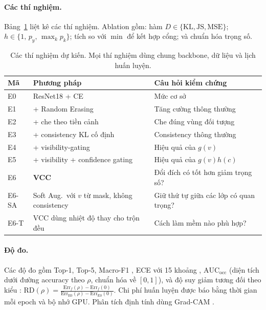 \documentclass[11pt,a4paper]{article}
\theoremstyle{plain}
\theoremstyle{definition}
\theoremstyle{remark}
\newcommand{\KL}{\mathrm{KL}}
\begin{document}
\paragraph{Các thí nghiệm.} Bảng~\ref{tab:exps} liệt kê các thí nghiệm. Ablation gồm: hàm $D\in\{\KL,\mathrm{JS},\mathrm{MSE}\}$; $h\in\{1,\,p_y,\,\max_k p_k\}$; tích so với $\min$ để kết hợp cổng; và chuẩn hóa trọng số.

\begin{table}[t]
\centering
\caption{Các thí nghiệm dự kiến. Mọi thí nghiệm dùng chung backbone, dữ liệu và lịch huấn luyện.}
\label{tab:exps}
\begin{tabular}{@{}lll@{}}
\toprule
Mã & Phương pháp & Câu hỏi kiểm chứng \\
\midrule
E0 & ResNet18 + CE & Mức cơ sở \\
E1 & + Random Erasing \cite{zhong2020random} & Tăng cường thông thường \\
E2 & + che theo tiền cảnh & Che đúng vùng đối tượng \\
E3 & + consistency KL cố định & Consistency thông thường \\
E4 & + visibility-gating & Hiệu quả của $g(v)$ \\
E5 & + visibility + confidence gating & Hiệu quả của $g(v)h(c)$ \\
E6 & \textbf{VCC} & Đổi đích có tốt hơn giảm trọng số? \\
E6-SA & Soft Aug.\ với $v$ từ mask, không consistency & Giữ thứ tự giữa các lớp có quan trọng? \\
E6-T & VCC dùng nhiệt độ thay cho trộn đều & Cách làm mềm nào phù hợp? \\
\bottomrule
\end{tabular}
\end{table}

\paragraph{Độ đo.} Các độ đo gồm Top-1, Top-5, Macro-F1 \cite{sokolova2009systematic}, ECE với 15 khoảng \cite{guo2017calibration}, $\mathrm{AUC}_{\mathrm{occ}}$ (diện tích dưới đường accuracy theo $\rho$, chuẩn hóa về $[0,1]$), và độ suy giảm tương đối theo kiểu \cite{hendrycks2019benchmarking}:
\(
  \mathrm{RD}(\rho)=\frac{\mathrm{Err}_f(\rho)-\mathrm{Err}_f(0)}{\mathrm{Err}_{\mathrm{E0}}(\rho)-\mathrm{Err}_{\mathrm{E0}}(0)}
\).
Chi phí huấn luyện được báo bằng thời gian mỗi epoch và bộ nhớ GPU. Phân tích định tính dùng Grad-CAM \cite{selvaraju2017gradcam}.
\end{document}
